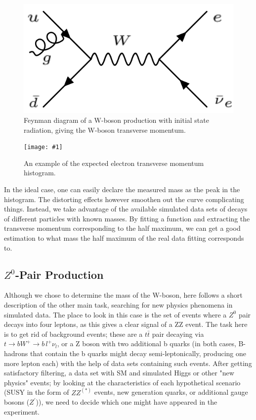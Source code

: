 \documentclass[twocolumn]{article}
\newcommand{\insertFigure}[1]{%
   \texttt{[image: \#1]}%
}
\begin{document}
\begin{figure} [!h]
\centering
\includegraphics[scale=0.25]{Images/WRadiation.png}
\caption{Feynman diagram of a W-boson production with initial state radiation, giving the W-boson transverse momentum.}
\label{fig:WRadiation}
\end{figure}
\begin{figure} [!h]
\centering
\insertFigure{Images/WmassExample.eps}
\caption{An example of the expected electron transverse momentum histogram.\cite{WMassExperiment}}
\end{figure}
In the ideal case, one can easily declare the measured mass as the peak in the histogram. The distorting effects however smoothen out the curve complicating things. Instead, we take advantage of the available simulated data sets of decays of different particles with known masses. By fitting a function and extracting the transverse momentum corresponding to the half maximum, we can get a good estimation to what mass the half maximum of the real data fitting corresponds to. %

\subsection{$Z^0$-Pair Production} %
Although we chose to determine the mass of the W-boson, here follows a short description of the other main task, searching for new physics phenomena in simulated data. The place to look in this case is the set of events where a $Z^0$ pair decays into four leptons, as this gives a clear signal of a ZZ event. The task here is to get rid of background events; these are a $t \bar{t}$ pair decaying via $t \rightarrow b W^+ \rightarrow b \, l^+ \nu_l$, or a Z boson with two additional b quarks (in both cases, B-hadrons that contain the b quarks might decay semi-leptonically, producing one more lepton each) with the help of data sets containing such events. After getting satisfactory filtering, a data set with SM and simulated Higgs or other "new physics" events; by looking at the characteristics of each hypothetical scenario (SUSY in the form of $Z Z^{(*)}$ events, new generation quarks, or additional gauge bosons ($Z^\prime$)), we need to decide which one might have appeared in the experiment.
\end{document}
